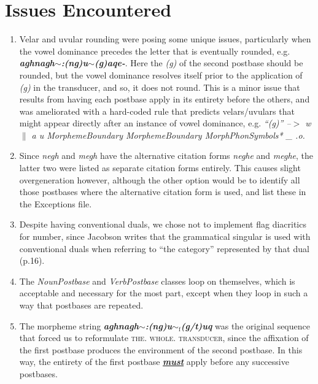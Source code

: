 \documentclass{article}
\begin{document}
\section{Issues Encountered}

\begin{enumerate}

\item Velar and uvular rounding were posing some unique issues, particularly when the vowel dominance precedes the letter that is eventually rounded, e.g. \textit{\textbf{aghnagh$\sim$:(ng)u$\sim$(g)aqe-}}.
%
Here the \textit{(g)} of the second postbase should be rounded, but the vowel dominance resolves itself prior to the application of \textit{(g)} in the transducer, and so, it does not round.
%
This is a minor issue that results from having each postbase apply in its entirety before the others, and was ameliorated with a hard-coded rule that predicts velars/uvulars that might appear directly after an instance of vowel dominance, e.g. \textit{``(g)'' --$>$ w $\|$ a u MorphemeBoundary MorphemeBoundary MorphPhonSymbols* \_ .o.}

\item Since \textit{negh} and \textit{megh} have the alternative citation forms \textit{neghe} and \textit{meghe}, the latter two were listed as separate citation forms entirely.
%
This causes slight overgeneration however, although the other option would be to identify all those postbases where the alternative citation form is used, and list these in the Exceptions file.

\item Despite having conventional duals, we chose not to implement flag diacritics for number, since Jacobson writes that the grammatical singular is used with conventional duals when referring to “the category” represented by that dual (p.16).

\item The \textit{NounPostbase} and \textit{VerbPostbase} classes loop on themselves, which is acceptable and necessary for the most part, except when they loop in such a way that postbases are repeated.

\item The morpheme string \textit{\textbf{aghnagh$\sim$:(ng)u${\sim}_\text{f}$(g/t)uq}} was the original sequence that forced us to reformulate \textsc{the. whole. transducer}, since the affixation of the first postbase produces the environment of the second postbase. In this way, the entirety of the first postbase \textit{\textbf{\uline{must}}} apply before any successive postbases.


\end{enumerate}
\end{document}
